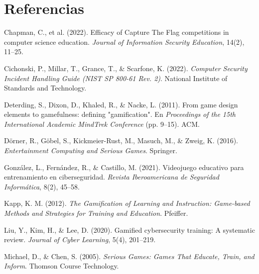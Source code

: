 \newpage
\section{Referencias}

\noindent Chapman, C., et al. (2022). Efficacy of Capture The Flag competitions in computer science education. \textit{Journal of Information Security Education}, 14(2), 11–25.

\vspace{0.3cm}

\noindent Cichonski, P., Millar, T., Grance, T., \& Scarfone, K. (2022). \textit{Computer Security Incident Handling Guide (NIST SP 800-61 Rev. 2)}. National Institute of Standards and Technology.

\vspace{0.3cm}

\noindent Deterding, S., Dixon, D., Khaled, R., \& Nacke, L. (2011). From game design elements to gamefulness: defining "gamification". En \textit{Proceedings of the 15th International Academic MindTrek Conference} (pp. 9–15). ACM.

\vspace{0.3cm}

\noindent Dörner, R., Göbel, S., Kickmeier-Rust, M., Masuch, M., \& Zweig, K. (2016). \textit{Entertainment Computing and Serious Games}. Springer.

\vspace{0.3cm}

\noindent González, L., Fernández, R., \& Castillo, M. (2021). Videojuego educativo para entrenamiento en ciberseguridad. \textit{Revista Iberoamericana de Seguridad Informática}, 8(2), 45–58.

\vspace{0.3cm}

\noindent Kapp, K. M. (2012). \textit{The Gamification of Learning and Instruction: Game-based Methods and Strategies for Training and Education}. Pfeiffer.

\vspace{0.3cm}

\noindent Liu, Y., Kim, H., \& Lee, D. (2020). Gamified cybersecurity training: A systematic review. \textit{Journal of Cyber Learning}, 5(4), 201–219.

\vspace{0.3cm}

\noindent Michael, D., \& Chen, S. (2005). \textit{Serious Games: Games That Educate, Train, and Inform}. Thomson Course Technology.

